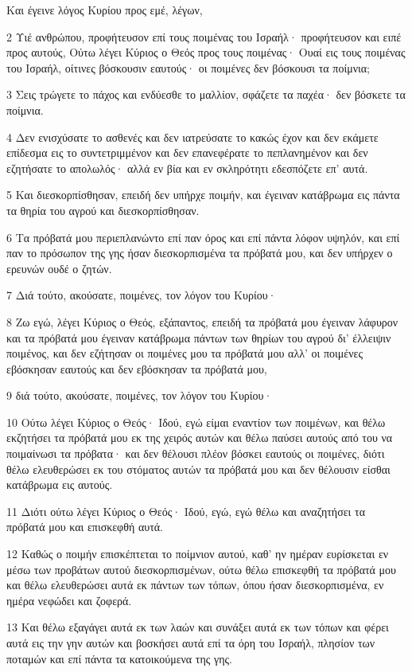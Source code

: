 \par Και έγεινε λόγος Κυρίου προς εμέ, λέγων,
\par 2 Υιέ ανθρώπου, προφήτευσον επί τους ποιμένας του Ισραήλ· προφήτευσον και ειπέ προς αυτούς, Ούτω λέγει Κύριος ο Θεός προς τους ποιμένας· Ουαί εις τους ποιμένας του Ισραήλ, οίτινες βόσκουσιν εαυτούς· οι ποιμένες δεν βόσκουσι τα ποίμνια;
\par 3 Σεις τρώγετε το πάχος και ενδύεσθε το μαλλίον, σφάζετε τα παχέα· δεν βόσκετε τα ποίμνια.
\par 4 Δεν ενισχύσατε το ασθενές και δεν ιατρεύσατε το κακώς έχον και δεν εκάμετε επίδεσμα εις το συντετριμμένον και δεν επανεφέρατε το πεπλανημένον και δεν εζητήσατε το απολωλός· αλλά εν βία και εν σκληρότητι εδεσπόζετε επ' αυτά.
\par 5 Και διεσκορπίσθησαν, επειδή δεν υπήρχε ποιμήν, και έγειναν κατάβρωμα εις πάντα τα θηρία του αγρού και διεσκορπίσθησαν.
\par 6 Τα πρόβατά μου περιεπλανώντο επί παν όρος και επί πάντα λόφον υψηλόν, και επί παν το πρόσωπον της γης ήσαν διεσκορπισμένα τα πρόβατά μου, και δεν υπήρχεν ο ερευνών ουδέ ο ζητών.
\par 7 Διά τούτο, ακούσατε, ποιμένες, τον λόγον του Κυρίου·
\par 8 Ζω εγώ, λέγει Κύριος ο Θεός, εξάπαντος, επειδή τα πρόβατά μου έγειναν λάφυρον και τα πρόβατά μου έγειναν κατάβρωμα πάντων των θηρίων του αγρού δι' έλλειψιν ποιμένος, και δεν εζήτησαν οι ποιμένες μου τα πρόβατά μου αλλ' οι ποιμένες εβόσκησαν εαυτούς και δεν εβόσκησαν τα πρόβατά μου,
\par 9 διά τούτο, ακούσατε, ποιμένες, τον λόγον του Κυρίου·
\par 10 Ούτω λέγει Κύριος ο Θεός· Ιδού, εγώ είμαι εναντίον των ποιμένων, και θέλω εκζητήσει τα πρόβατά μου εκ της χειρός αυτών και θέλω παύσει αυτούς από του να ποιμαίνωσι τα πρόβατα· και δεν θέλουσι πλέον βόσκει εαυτούς οι ποιμένες, διότι θέλω ελευθερώσει εκ του στόματος αυτών τα πρόβατά μου και δεν θέλουσιν είσθαι κατάβρωμα εις αυτούς.
\par 11 Διότι ούτω λέγει Κύριος ο Θεός· Ιδού, εγώ, εγώ θέλω και αναζητήσει τα πρόβατά μου και επισκεφθή αυτά.
\par 12 Καθώς ο ποιμήν επισκέπτεται το ποίμνιον αυτού, καθ' ην ημέραν ευρίσκεται εν μέσω των προβάτων αυτού διεσκορπισμένων, ούτω θέλω επισκεφθή τα πρόβατά μου και θέλω ελευθερώσει αυτά εκ πάντων των τόπων, όπου ήσαν διεσκορπισμένα, εν ημέρα νεφώδει και ζοφερά.
\par 13 Και θέλω εξαγάγει αυτά εκ των λαών και συνάξει αυτά εκ των τόπων και φέρει αυτά εις την γην αυτών και βοσκήσει αυτά επί τα όρη του Ισραήλ, πλησίον των ποταμών και επί πάντα τα κατοικούμενα της γης.
